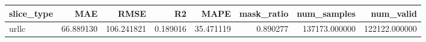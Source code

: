 \begin{tabular}{lrrrrrrr}
\toprule
slice_type & MAE & RMSE & R2 & MAPE & mask_ratio & num_samples & num_valid \\
\midrule
urllc & 66.889130 & 106.241821 & 0.189016 & 35.471119 & 0.890277 & 137173.000000 & 122122.000000 \\
\bottomrule
\end{tabular}
